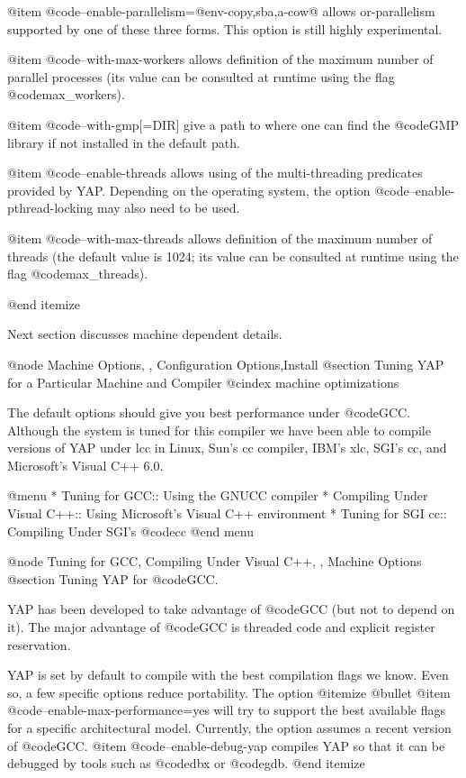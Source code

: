  @item @code{--enable-parallelism=@{env-copy,sba,a-cow@}} allows
or-parallelism supported by one of these three forms. This option is
still highly experimental.

 @item @code{--with-max-workers} allows definition of the maximum 
number of parallel processes (its value can be consulted at runtime 
using the flag @code{max_workers}).

 @item @code{--with-gmp[=DIR]} give a path to where one can find the
@code{GMP} library if not installed in the default path.

 @item @code{--enable-threads} allows using of the multi-threading 
predicates provided by YAP. Depending on the operating system, the 
option @code{--enable-pthread-locking} may also need to be used.

 @item @code{--with-max-threads} allows definition of the maximum 
number of threads (the default value is 1024; its value can be consulted 
at runtime using the flag @code{max_threads}).

@end itemize

Next section discusses machine dependent details.

@node Machine Options, , Configuration Options,Install
@section Tuning YAP for a Particular Machine and Compiler
@cindex machine optimizations

The default options should give you best performance under
@code{GCC}. Although the system is tuned for this compiler
we have been able to compile versions of YAP under lcc in Linux,
Sun's cc compiler, IBM's xlc, SGI's cc, and Microsoft's Visual C++
6.0.

@menu
* Tuning for GCC:: Using the GNUCC compiler
* Compiling Under Visual C++:: Using Microsoft's Visual C++ environment
* Tuning for SGI cc:: Compiling Under SGI's @code{cc}
@end menu


@node Tuning for GCC, Compiling Under Visual C++, , Machine Options
@section Tuning YAP for @code{GCC}.

YAP has been developed to take advantage of @code{GCC} (but not to
depend on it). The major advantage of @code{GCC} is threaded code and
explicit register reservation.

YAP is set by default to compile with the best compilation flags we
know. Even so, a few specific options reduce portability.  The option 
@itemize @bullet
 @item @code{--enable-max-performance=yes} will try to support the best
available flags for a specific architectural model. Currently, the option
assumes a recent version of @code{GCC}.
 @item @code{--enable-debug-yap} compiles YAP so that it can be debugged
by tools such as @code{dbx} or @code{gdb}.
@end itemize

